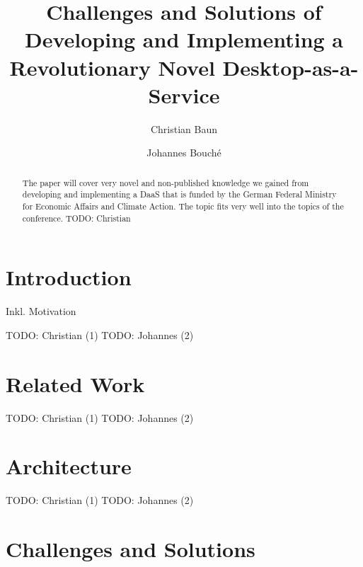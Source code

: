 \documentclass[runningheads]{llncs}
\begin{document}
%
\title{Challenges and Solutions of Developing and
Implementing a Revolutionary Novel Desktop-as-a-Service}
%
%
\author{Christian Baun \and
Johannes Bouché}
%
%
%
\maketitle              %
%
\begin{abstract}
The paper will cover very novel and non-published knowledge we gained
from developing and implementing a DaaS that is funded by the German
Federal Ministry for Economic Affairs and Climate Action. The topic
fits very well into the topics of the conference. TODO: Christian

\end{abstract}
%
%
%
\section{Introduction}

Inkl. Motivation

TODO: Christian (1)
TODO: Johannes (2)

\section{Related Work}

TODO: Christian (1)
TODO: Johannes (2)

\section{Architecture}

TODO: Christian (1)
TODO: Johannes (2)

\section{Challenges and Solutions}
\end{document}
